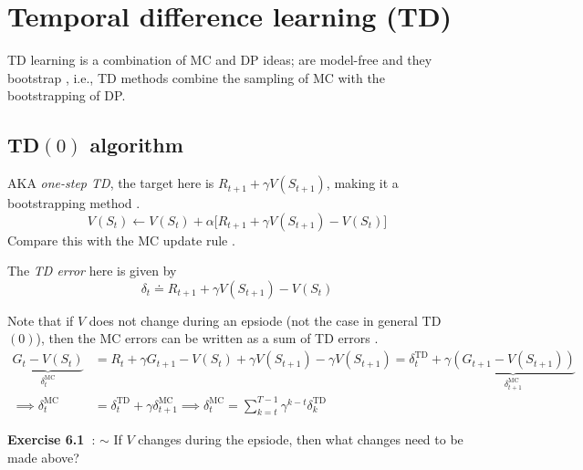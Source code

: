 \section{Temporal difference learning (TD)}

TD learning is a combination of MC and DP ideas; are model-free  and they bootstrap , i.e., TD methods combine the sampling of MC with the bootstrapping of DP.

\subsection{TD\texorpdfstring{\( (0) \)}{ (0) } algorithm}

AKA \textit{one-step TD}, the target here is \( R_{t+1} + \gamma V(S_{t+1}) \), making it a bootstrapping method .
\begin{equation}
    V(S_t) \leftarrow V(S_t) + \alpha \Big[ R_{t+1} + \gamma V(S_{t+1}) - V(S_t) \Big]
\end{equation}
Compare this with the MC update rule .

The \textit{TD error} here is given by
\begin{equation}\label{eq:td-error-TD0}
    \delta_t \doteq R_{t+1} + \gamma V(S_{t+1}) - V(S_t)
\end{equation}

Note that if \( V \) does not change during an epsiode (not the case in general TD\( (0) \)), then the MC errors  can be written as a sum of TD errors .
\begin{align*}
    \underbrace{ G_t - V(S_t) }_{\delta_{t}^{\text{MC}}}
     & =
    R_t + \gamma G_{t+1} - V(S_t) + \gamma V(S_{t+1}) - \gamma V(S_{t+1})
    =
    \delta_{t}^{\text{TD}} + \gamma \underbrace{ (G_{t+1} - V(S_{t+1})) }_{\delta_{t+1}^{\text{MC}}}
    \\
    \implies
    \delta_{t}^{\text{MC}}
     & =
    \delta_{t}^{\text{TD}} + \gamma \delta_{t+1}^{\text{MC}}
    \implies
    \delta_{t}^{\text{MC}}
    =
    \sum_{k = t}^{T-1} \gamma^{k-t} \delta_{k}^{\text{TD}}
\end{align*}

\textbf{Exercise 6.1~\cite{Sutton1998}}:
\( \sim \) If \( V \) changes during the epsiode, then what changes need to be made above?

